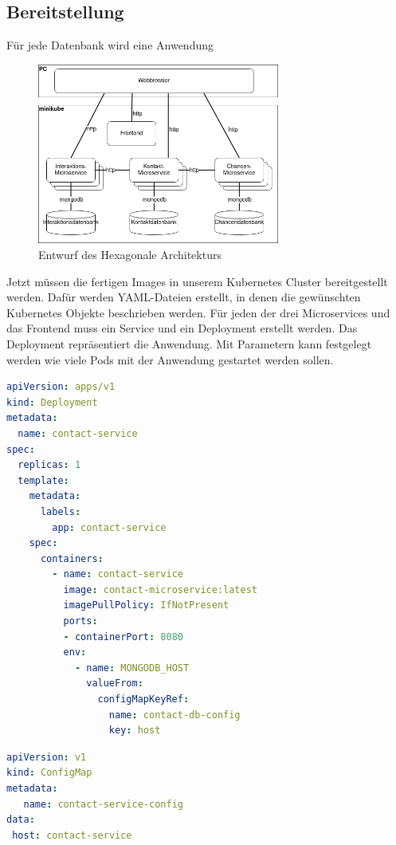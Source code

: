 \subsection{Bereitstellung}

Für jede Datenbank wird eine Anwendung 

\begin{figure}[H] 
    \centering
    \includegraphics[width=0.71\textwidth]{figures/DeploymentDiagramm.png}
    \caption{Entwurf des \acp{Hexagonale Architektur}}
    \label{fig:CRMENTWURF}
\end{figure}

Jetzt müssen die fertigen Images in unserem Kubernetes Cluster bereitgestellt werden. Dafür werden YAML-Dateien erstellt, in denen die gewünschten Kubernetes Objekte beschrieben werden. Für jeden der drei Microservices und das Frontend muss ein Service und ein Deployment erstellt werden. Das Deployment repräsentiert die Anwendung. Mit Parametern kann festgelegt werden wie viele Pods mit der Anwendung gestartet werden sollen.

\begin{lstlisting}[language=YAML, caption=Befehl]
apiVersion: apps/v1
kind: Deployment
metadata:
  name: contact-service
spec:
  replicas: 1
  template:
    metadata:
      labels:
        app: contact-service
    spec:
      containers:
        - name: contact-service
          image: contact-microservice:latest
          imagePullPolicy: IfNotPresent
          ports:
          - containerPort: 8080
          env:
            - name: MONGODB_HOST
              valueFrom:
                configMapKeyRef:
                  name: contact-db-config  
                  key: host
\end{lstlisting}

\begin{lstlisting}[language=YAML, morekeywords=host, caption=Befehl , captionpos=b]
apiVersion: v1
kind: ConfigMap
metadata:
   name: contact-service-config
data:
 host: contact-service
\end{lstlisting}

